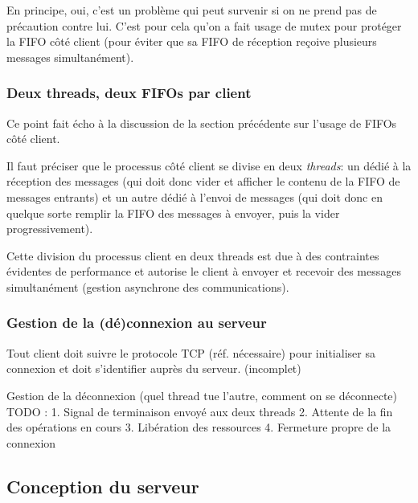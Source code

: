 \documentclass{article}
\begin{document}
En principe, oui, c'est un problème qui peut survenir si on ne prend pas de précaution contre lui. C'est pour cela qu'on a fait usage de mutex pour protéger la FIFO côté client (pour éviter que sa FIFO de réception reçoive plusieurs messages simultanément).


\subsubsection{Deux threads, deux FIFOs par client}
Ce point fait écho à la discussion de la section précédente sur l'usage de FIFOs côté client. 

Il faut préciser que le processus côté client se divise en deux \textit{threads}: un dédié à la réception des messages (qui doit donc vider et afficher le contenu de la FIFO de messages entrants) et un autre dédié à l'envoi de messages (qui doit donc en quelque sorte remplir la FIFO des messages à envoyer, puis la vider progressivement). 

Cette division du processus client en deux threads est due à des contraintes évidentes de performance et autorise le client à envoyer et recevoir des messages simultanément (gestion asynchrone des communications).

\subsubsection{Gestion de la (dé)connexion au serveur}
Tout client doit suivre le protocole TCP (réf. nécessaire) pour initialiser sa connexion et doit s'identifier auprès du serveur.
(incomplet)


 Gestion de la déconnexion (quel thread tue l'autre, comment on se déconnecte) TODO :
1. Signal de terminaison envoyé aux deux threads
2. Attente de la fin des opérations en cours
3. Libération des ressources
4. Fermeture propre de la connexion

\subsection{Conception du serveur}
\end{document}
